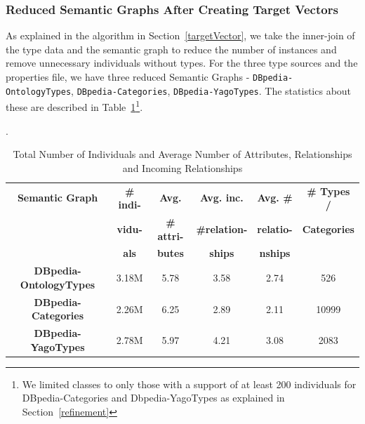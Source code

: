 \documentclass[runningheads,a4paper]{IEEEtran}
\begin{document}
\subsubsection{Reduced Semantic Graphs After Creating Target Vectors}
As explained in the algorithm in Section~\ref{targetVector}, we take the inner-join of the type data and the semantic graph to reduce the number of instances and remove unnecessary individuals without types. For the three type sources and the properties file, we have three reduced Semantic Graphs - \texttt{DBpedia-OntologyTypes}, \texttt{DBpedia-Categories}, \texttt{DBpedia-YagoTypes}. The statistics about these are described in Table~\ref{tab:graphStats1}\footnote{We limited classes to only those with a support of at least 200 individuals for DBpedia-Categories and Dbpedia-YagoTypes as explained in Section~\ref{refinement}}.
\begin{table} [h]
\centering
\caption{Total Number of Individuals and Average Number of Attributes, Relationships and Incoming Relationships}.
\label{tab:graphStats1}
  \begin{tabular}{ | c | c | c | c | c | c | }
    \hline
    \textbf{Semantic Graph} & \textbf{\# indi-} & \textbf{Avg.} & \textbf{Avg. inc.}& \textbf{Avg. \#} & \textbf{\# Types /}\\
    & \textbf{vidu-} & \textbf{\# attri-\-} & \textbf{\#relation-\-}& \textbf{relatio-} & \textbf{Categories}\\
    & \textbf{als} & \textbf{butes} & \textbf{ships} &  \textbf{nships} &\\
    \hline
    \textbf{DBpedia-OntologyTypes} & 3.18M & 5.78 & 3.58 & 2.74 & 526 \\
    \hline
    \textbf{DBpedia-Categories} & 2.26M & 6.25 & 2.89 & 2.11 &  10999 \\
    \hline
    \textbf{DBpedia-YagoTypes} & 2.78M & 5.97 & 4.21 & 3.08 &  2083\\
    \hline
  \end{tabular}
\end{table}
\end{document}
